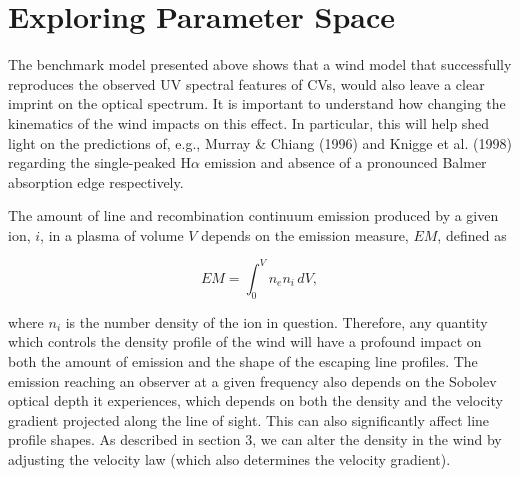 \documentclass[preprint, a4paper, 11pt]{aastex}
\begin{document}
{%








%
%

\section{Exploring Parameter Space}

The benchmark model presented above shows that a wind model
 that successfully reproduces the observed UV spectral features
of CVs,  
would also leave a clear imprint on the optical spectrum. 
It is important
to understand how changing the kinematics of the wind impacts on this
effect.   
In particular, this
will help shed light on the predictions of, e.g., Murray \& Chiang (1996)
and Knigge et al. (1998) regarding the single-peaked H$\alpha$ emission
and absence of a pronounced Balmer absorption edge respectively.

The amount of line and recombination continuum
emission produced by a given ion, $i$, in a plasma of volume $V$
depends on the emission measure, $EM$, defined as

\begin{equation}
EM=\int^V_0 n_e n_i \,dV,
\end{equation}


where $n_i$ is the number density of the ion in question.    
Therefore, any quantity which controls the density profile of the wind
will have a profound impact on both the 
amount of emission and the shape of the escaping line profiles.
The emission reaching an observer at a given frequency
also depends on the Sobolev optical depth it experiences, which depends on both
the density and the velocity gradient projected
along the line of sight. This can also significantly affect line profile shapes.       
As described in section 3, we can alter the density in the wind by 
adjusting the velocity law (which also determines the velocity gradient). 

}
\end{document}
